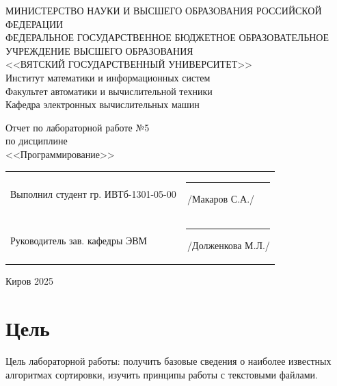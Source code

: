 \documentclass[a4paper,14pt]{extarticle}
\begin{document}
	\newpage\thispagestyle{empty}
	\begin{center}
		\MakeUppercase{
			Министерство науки и высшего образования Российской Федерации\\
			Федеральное государственное бюджетное образовательное учреждение высшего образования\\
			<<Вятский Государственный Университет>>\\
		}
		Институт математики и информационных систем\\
		Факультет автоматики и вычислительной техники\\
		Кафедра электронных вычислительных машин
	\end{center}
	\vfill
	
	\begin{center}
		Отчет по лабораторной работе №5\\
		по дисциплине\\
		<<Программирование>>\\
	\end{center}
	\vfill
	
	\noindent
	\begin{tabular}{ll}
		Выполнил студент гр. ИВТб-1301-05-00 \hspace{5mm} &
		\rule[-1mm]{25mm}{0.10mm}\,/Макаров С.А./\\
		
		Руководитель зав. кафедры ЭВМ & \rule[-1mm]{25mm}{0.10mm}\,/Долженкова М.Л./\\
	\end{tabular}
	
	\vfill
	\begin{center}
		Киров 2025
	\end{center}
	
	\newpage
	\section*{Цель}
	Цель лабораторной работы: получить базовые сведения о наиболее известных алгоритмах сортировки, изучить принципы работы с текстовыми файлами.
	
\end{document}
